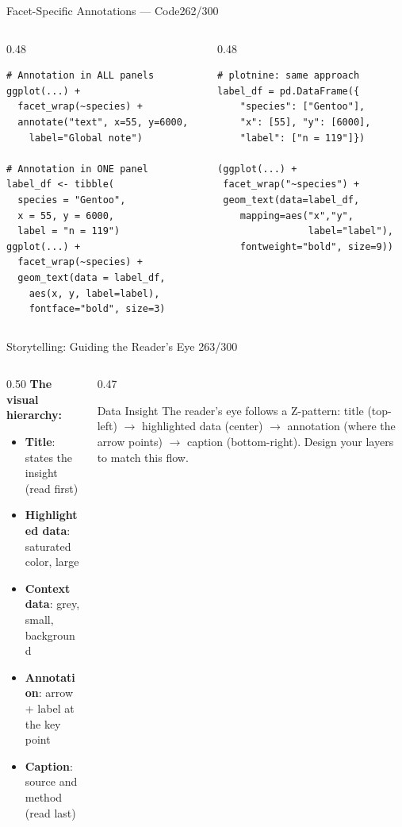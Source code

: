 \documentclass[10pt]{beamer}
\newcommand{\smark}[1]{\hfill{\scriptsize\color{codegray}#1}}
\begin{document}
\begin{frame}[fragile]{Facet-Specific Annotations --- Code}\smark{262/300}
\begin{columns}[T]
\begin{column}{0.48\textwidth}
\begin{lstlisting}[style=Rstyle]
# Annotation in ALL panels
ggplot(...) +
  facet_wrap(~species) +
  annotate("text", x=55, y=6000,
    label="Global note")

# Annotation in ONE panel
label_df <- tibble(
  species = "Gentoo",
  x = 55, y = 6000,
  label = "n = 119")
ggplot(...) +
  facet_wrap(~species) +
  geom_text(data = label_df,
    aes(x, y, label=label),
    fontface="bold", size=3)
\end{lstlisting}
\end{column}
\begin{column}{0.48\textwidth}
\begin{lstlisting}[style=Pystyle]
# plotnine: same approach
label_df = pd.DataFrame({
    "species": ["Gentoo"],
    "x": [55], "y": [6000],
    "label": ["n = 119"]})

(ggplot(...) +
 facet_wrap("~species") +
 geom_text(data=label_df,
    mapping=aes("x","y",
                label="label"),
    fontweight="bold", size=9))
\end{lstlisting}
\end{column}
\end{columns}
\end{frame}

\begin{frame}{Storytelling: Guiding the Reader's Eye}
\smark{263/300}
\begin{columns}[T]
\begin{column}{0.50\textwidth}
    \textbf{The visual hierarchy:}
    \begin{itemize}
        \item \textbf{Title}: states the insight (read first)
        \item \textbf{Highlighted data}: saturated color, large
        \item \textbf{Context data}: grey, small, background
        \item \textbf{Annotation}: arrow + label at the key point
        \item \textbf{Caption}: source and method (read last)
    \end{itemize}
\end{column}
\begin{column}{0.47\textwidth}
\begin{exampleblock}{Data Insight}
    \scriptsize The reader's eye follows a Z-pattern: title (top-left) $\to$ highlighted data (center) $\to$ annotation (where the arrow points) $\to$ caption (bottom-right). Design your layers to match this flow.
\end{exampleblock}
\end{column}
\end{columns}
\end{frame}
\end{document}
